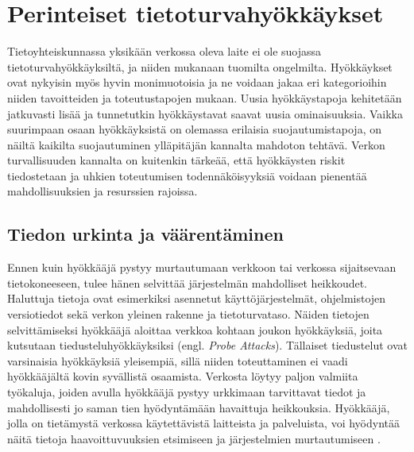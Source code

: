 
\chapter{Perinteiset tietoturvahyökkäykset}

Tietoyhteiskunnassa yksikään verkossa oleva laite ei ole suojassa
tietoturvahyökkäyksiltä, ja niiden mukanaan tuomilta
ongelmilta. Hyökkäykset ovat nykyisin myös hyvin monimuotoisia ja ne
voidaan jakaa eri kategorioihin niiden tavoitteiden ja toteutustapojen
mukaan. Uusia hyökkäystapoja kehitetään jatkuvasti lisää ja
tunnetutkin hyökkäystavat saavat uusia ominaisuuksia. Vaikka
suurimpaan osaan hyökkäyksistä on olemassa erilaisia
suojautumistapoja, on näiltä kaikilta suojautuminen ylläpitäjän
kannalta mahdoton tehtävä. Verkon turvallisuuden kannalta on kuitenkin
tärkeää, että hyökkäysten riskit tiedostetaan ja uhkien toteutumisen
todennäköisyyksiä voidaan pienentää mahdollisuuksien ja resurssien
rajoissa.


\section{Tiedon urkinta ja väärentäminen}

Ennen kuin hyökkääjä pystyy murtautumaan verkkoon tai verkossa
sijaitsevaan tietokoneeseen, tulee hänen selvittää järjestelmän
mahdolliset heikkoudet. Haluttuja tietoja ovat esimerkiksi asennetut
käyttöjärjestelmät, ohjelmistojen versiotiedot sekä verkon yleinen
rakenne ja tietoturvataso. Näiden tietojen selvittämiseksi hyökkääjä
aloittaa verkkoa kohtaan joukon hyökkäyksiä, joita kutsutaan
tiedusteluhyökkäyksiksi (engl. \textit{Probe Attacks}). Tällaiset
tiedustelut ovat varsinaisia hyökkäyksiä yleisempiä, sillä niiden
toteuttaminen ei vaadi hyökkääjältä kovin syvällistä
osaamista. Verkosta löytyy paljon valmiita työkaluja, joiden avulla
hyökkääjä pystyy urkkimaan tarvittavat tiedot ja mahdollisesti jo
saman tien hyödyntämään havaittuja heikkouksia. Hyökkääjä, jolla on
tietämystä verkossa käytettävistä laitteista ja palveluista, voi
hyödyntää näitä tietoja haavoittuvuuksien etsimiseen ja järjestelmien
murtautumiseen \cite{IDS}.

